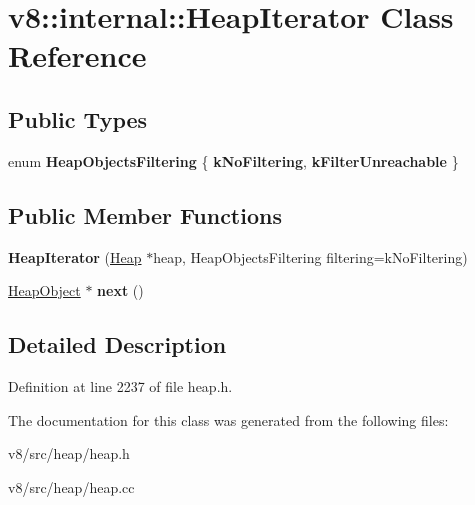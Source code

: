 \hypertarget{classv8_1_1internal_1_1HeapIterator}{}\section{v8\+:\+:internal\+:\+:Heap\+Iterator Class Reference}
\label{classv8_1_1internal_1_1HeapIterator}
\subsection*{Public Types}
\begin{DoxyCompactItemize}
\item 
\mbox{\label{classv8_1_1internal_1_1HeapIterator_a7f4a644e63f3ce4374b2c13ee806d239}} 
enum {\bfseries Heap\+Objects\+Filtering} \{ {\bfseries k\+No\+Filtering}, 
{\bfseries k\+Filter\+Unreachable}
 \}
\end{DoxyCompactItemize}
\subsection*{Public Member Functions}
\begin{DoxyCompactItemize}
\item 
\mbox{\label{classv8_1_1internal_1_1HeapIterator_a9fb0c7b292b462fe8259f015e7c17920}} 
{\bfseries Heap\+Iterator} (\mbox{\hyperlink{classv8_1_1internal_1_1Heap}{Heap}} $\ast$heap, Heap\+Objects\+Filtering filtering=k\+No\+Filtering)
\item 
\mbox{\label{classv8_1_1internal_1_1HeapIterator_a4056af897750890f6c02715c32ba65ee}} 
\mbox{\hyperlink{classv8_1_1internal_1_1HeapObject}{Heap\+Object}} $\ast$ {\bfseries next} ()
\end{DoxyCompactItemize}


\subsection{Detailed Description}


Definition at line 2237 of file heap.\+h.



The documentation for this class was generated from the following files\+:\begin{DoxyCompactItemize}
\item 
v8/src/heap/heap.\+h\item 
v8/src/heap/heap.\+cc\end{DoxyCompactItemize}
